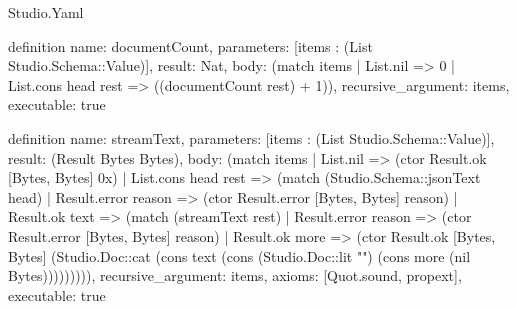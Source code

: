 \begin{lexlean}{Studio.Yaml}
\begin{semanticmodule}
definition{
  name: documentCount,
  parameters: [items : (List Studio.Schema::Value)],
  result: Nat,
  body: (match items
    | List.nil => 0
    | List.cons head rest => ((documentCount rest) + 1)),
  recursive_argument: items,
  executable: true
}

definition{
  name: streamText,
  parameters: [items : (List Studio.Schema::Value)],
  result: (Result Bytes Bytes),
  body: (match items
    | List.nil => (ctor Result.ok [Bytes, Bytes] 0x)
    | List.cons head rest => (match (Studio.Schema::jsonText head)
      | Result.error reason => (ctor Result.error [Bytes, Bytes] reason)
      | Result.ok text => (match (streamText rest)
        | Result.error reason => (ctor Result.error [Bytes, Bytes] reason)
        | Result.ok more => (ctor Result.ok [Bytes, Bytes] (Studio.Doc::cat (cons text (cons (Studio.Doc::lit "\n") (cons more (nil Bytes))))))))),
  recursive_argument: items,
  axioms: [Quot.sound, propext],
  executable: true
}

\end{semanticmodule}
\end{lexlean}
